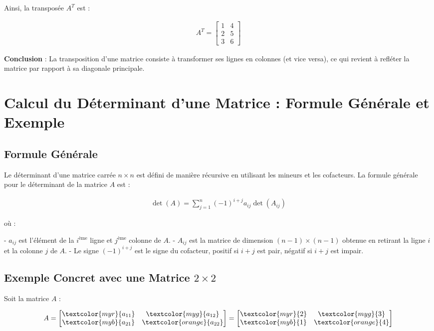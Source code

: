 \documentclass{report}
\begin{document}
\begin{multicols*}{2}
Ainsi, la transposée $A^T$ est :

\begin{align*}
    A^T = \begin{bmatrix}
        1 & 4 \\
        2 & 5 \\
        3 & 6
    \end{bmatrix}
\end{align*}

\noindent
\textbf{Conclusion} : La transposition d'une matrice consiste à transformer ses lignes
en colonnes (et vice versa), ce qui revient à refléter la matrice par rapport à sa diagonale principale.


\section{Calcul du Déterminant d'une Matrice : Formule Générale et Exemple}

\subsection{Formule Générale}

Le déterminant d'une matrice carrée $n \times n$ est défini de manière récursive en utilisant les mineurs et les cofacteurs. La formule générale pour le déterminant de la matrice $A$ est :

\begin{align*}
    \det(A) = \sum_{j=1}^{n} (-1)^{i+j} a_{ij} \det(A_{ij})
\end{align*}

où :

- $a_{ij}$ est l'élément de la $i^\text{ème}$ ligne et $j^\text{ème}$ colonne de $A$.
- $A_{ij}$ est la matrice de dimension $(n - 1) \times (n - 1)$ obtenue en retirant la ligne $i$ et la colonne $j$ de $A$.
- Le signe $(-1)^{i+j}$ est le signe du cofacteur, positif si $i + j$ est pair, négatif si $i + j$ est impair.

\subsection{Exemple Concret avec une Matrice $2 \times 2$}

Soit la matrice $A$ :

\begin{align*}
    A = \begin{bmatrix}
        \textcolor{myr}{a_{11}} & \textcolor{myg}{a_{12}} \\
        \textcolor{myb}{a_{21}} & \textcolor{orange}{a_{22}}
    \end{bmatrix}
    = \begin{bmatrix}
        \textcolor{myr}{2} & \textcolor{myg}{3} \\
        \textcolor{myb}{1} & \textcolor{orange}{4}
    \end{bmatrix}
\end{align*}


\end{multicols*}
\end{document}
